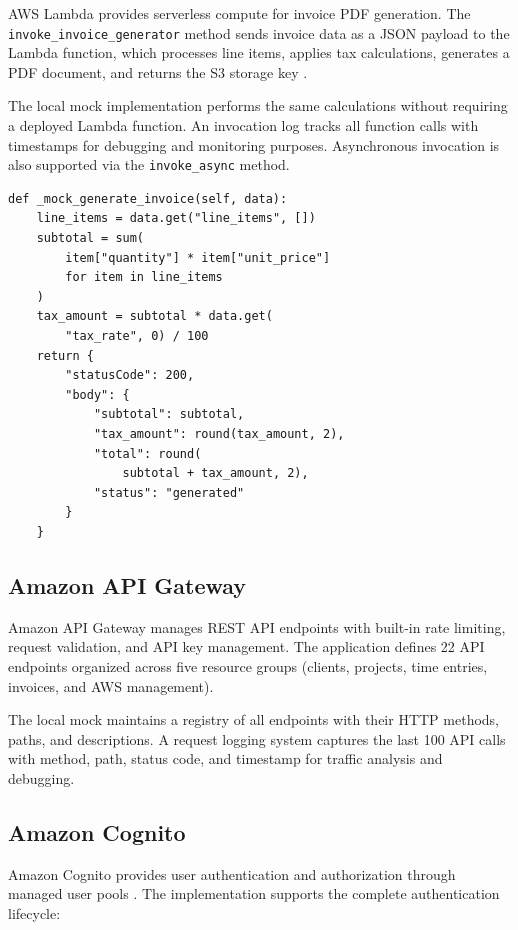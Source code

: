 \documentclass[conference]{IEEEtran}
\begin{document}
AWS Lambda provides serverless compute for invoice PDF generation. The \texttt{invoke\_invoice\_generator} method sends invoice data as a JSON payload to the Lambda function, which processes line items, applies tax calculations, generates a PDF document, and returns the S3 storage key \cite{lambda}.

The local mock implementation performs the same calculations without requiring a deployed Lambda function. An invocation log tracks all function calls with timestamps for debugging and monitoring purposes. Asynchronous invocation is also supported via the \texttt{invoke\_async} method.

\begin{lstlisting}[caption={Lambda mock invoice generation},label=lst:lambda]
def _mock_generate_invoice(self, data):
    line_items = data.get("line_items", [])
    subtotal = sum(
        item["quantity"] * item["unit_price"]
        for item in line_items
    )
    tax_amount = subtotal * data.get(
        "tax_rate", 0) / 100
    return {
        "statusCode": 200,
        "body": {
            "subtotal": subtotal,
            "tax_amount": round(tax_amount, 2),
            "total": round(
                subtotal + tax_amount, 2),
            "status": "generated"
        }
    }
\end{lstlisting}

\subsection{Amazon API Gateway}

Amazon API Gateway manages REST API endpoints with built-in rate limiting, request validation, and API key management. The application defines 22 API endpoints organized across five resource groups (clients, projects, time entries, invoices, and AWS management).

The local mock maintains a registry of all endpoints with their HTTP methods, paths, and descriptions. A request logging system captures the last 100 API calls with method, path, status code, and timestamp for traffic analysis and debugging.

\subsection{Amazon Cognito}

Amazon Cognito provides user authentication and authorization through managed user pools \cite{cognito}. The implementation supports the complete authentication lifecycle:
\end{document}
